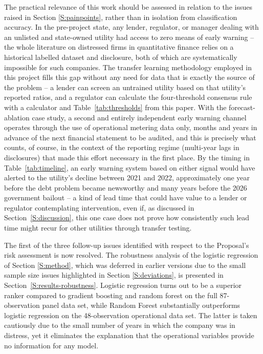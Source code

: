 \documentclass[final,1p,times]{elsarticle}
\begin{document}
The practical relevance of this work should be assessed in relation to the issues raised in Section \ref{S:painpoints}, rather than in isolation from classification accuracy. In the pre-project state, any lender, regulator, or manager dealing with an unlisted and state-owned utility had access to zero means of early warning -- the whole literature on distressed firms in quantitative finance relies on a historical labelled dataset and disclosure, both of which are systematically impossible for such companies. The transfer learning methodology employed in this project fills this gap without any need for data that is exactly the source of the problem -- a lender can screen an untrained utility based on that utility's reported ratios, and a regulator can calculate the four-threshold consensus rule with a calculator and Table~\ref{tab:thresholds} from this paper. With the forecast-ablation case study, a second and entirely independent early warning channel operates through the use of operational metering data only, months and years in advance of the next financial statement to be audited, and this is precisely what counts, of course, in the context of the reporting regime (multi-year lags in disclosures) that made this effort necessary in the first place. By the timing in Table~\ref{tab:timeline}, an early warning system based on either signal would have alerted to the utility's decline between 2021 and 2022, approximately one year before the debt problem became newsworthy and many years before the 2026 government bailout -- a kind of lead time that could have value to a lender or regulator contemplating intervention, even if, as discussed in Section~\ref{S:discussion}, this one case does not prove how consistently such lead time might recur for other utilities through transfer testing.

The first of the three follow-up issues identified with respect to the Proposal’s risk assessment is now resolved. The robustness analysis of the logistic regression of Section \ref{S:method}, which was deferred in earlier versions due to the small sample size issues highlighted in Section \ref{S:deviations}, is presented in Section~\ref{S:results-robustness}. Logistic regression turns out to be a superior ranker compared to gradient boosting and random forest on the full 87-observation panel data set, while Random Forest substantially outperforms logistic regression on the 48-observation operational data set. The latter is taken cautiously due to the small number of years in which the company was in distress, yet it eliminates the explanation that the operational variables provide no information for any model.
\end{document}
